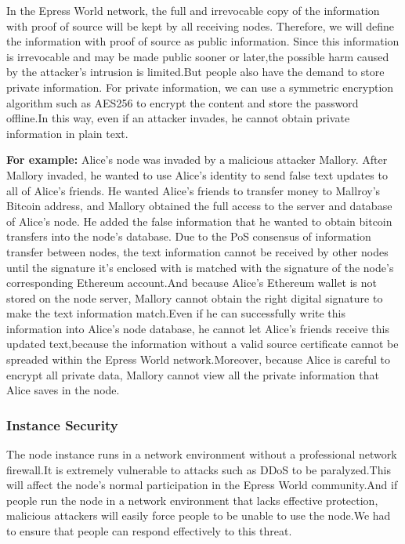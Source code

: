 \documentclass{article}
\begin{document}
    In the Epress World network, the full and irrevocable copy of the information with proof of source will be kept  by all receiving nodes. Therefore, we will define the information with proof of source as public information. Since this information is irrevocable and may be made public sooner or later,the possible harm caused by the attacker's intrusion is limited.But people also have the demand to store private information. For private information, we can use a symmetric encryption algorithm such as AES256 to encrypt the content and store the password offline.In this way, even if an attacker invades, he cannot obtain private information in plain text.
    ~\newline
    \begin{blockqt}
    \textbf{For example: }Alice's node was invaded by a malicious attacker Mallory. After Mallory invaded, he wanted to use Alice's identity to send false text updates to all of Alice's friends. He wanted  Alice's friends to  transfer money to Mallroy's Bitcoin address, and Mallory obtained the full access to the server and database of Alice's node. He added the false information that he wanted to obtain bitcoin transfers into the node's database. Due to the PoS consensus of information transfer between nodes, the text information cannot be received by other nodes until the signature it's enclosed with is matched with the signature of the node's corresponding Ethereum account.And because Alice's Ethereum wallet is not stored on the node server, Mallory cannot obtain the right digital signature to make the text information match.Even if he can successfully write this information into Alice's node database, he cannot let Alice's friends receive this updated text,because the information without a valid source certificate cannot be spreaded within the Epress World network.Moreover, because Alice is careful to encrypt all private data, Mallory cannot view all the private information that Alice saves in the node. 
    \end{blockqt}
\subsubsection{Instance Security}
    The node instance runs in a network environment without a professional network firewall.It is extremely vulnerable to attacks such as DDoS to be paralyzed.This will affect the node's normal participation in the Epress World community.And if people run the node in a network environment that lacks effective protection, malicious attackers will easily force people to be unable to use the node.We had to ensure that people can respond effectively to this threat.
\end{document}
